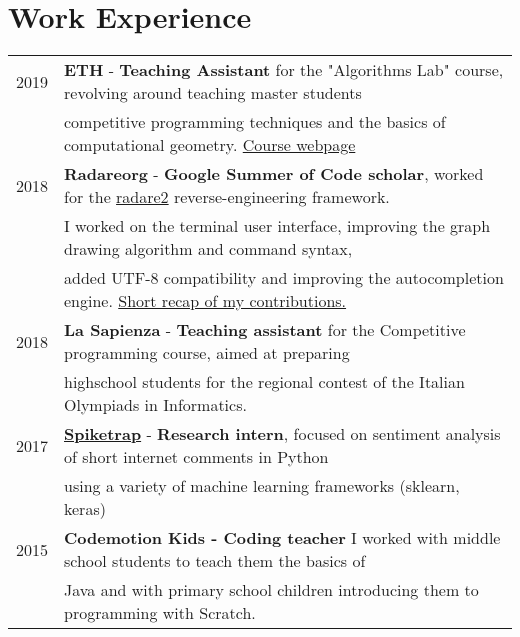 \documentclass[a4paper,10pt]{article} %
\newcommand{\mh}[0]{{\hspace*{-1em}}}
\newcommand{\mH}[0]{{\hspace*{0.5em}}}
\begin{document}
\section{Work Experience}
\begin{tabular}{ll}
2019 \mH & \mh \textbf{ETH} - \textbf{Teaching Assistant} for the "Algorithms Lab" course, revolving around teaching master students \\ 
         & competitive programming techniques and the basics of computational geometry. \href{https://www.cadmo.ethz.ch/education/lectures/HS19/algolab/index.html}{Course webpage} \\
2018 & \mh \textbf{Radareorg} - \textbf{Google Summer of Code scholar}, worked for the \href{http://beta.rada.re/en/latest/}{radare2} reverse-engineering framework.\\
     & I worked on the terminal user interface, improving the graph drawing algorithm and command syntax, \\
	 & added UTF-8 compatibility and improving the autocompletion engine. \href{https://gist.github.com/cyanpencil/27db326bf6f9d2747297fa9b943eb65b#file-gsoc_report_final-md}{Short recap of my contributions.}  \\
2018 & \mh \textbf{La Sapienza} - \textbf{Teaching assistant} for the Competitive programming course, aimed at preparing \\ 
     & highschool students for the regional contest of the Italian Olympiads in Informatics.  \\
2017 & \mh \href{http://www.spiketrap.io/}{\textbf{Spiketrap}} - \textbf{Research intern}, focused on sentiment analysis of short internet comments in Python\\
     & using a variety of machine learning frameworks (sklearn, keras) \\
2015 & \mh \textbf{Codemotion Kids - Coding teacher} I worked with middle school students to teach them the basics of \\
     & Java and with primary school children introducing them to programming with Scratch.
\end{tabular}
\end{document}
